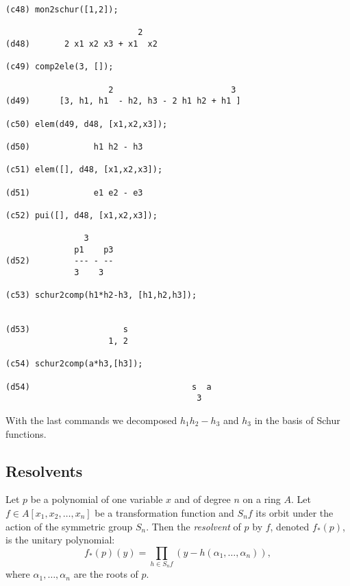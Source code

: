 \documentclass[11pt]{article}
\begin{document}
\begin{verbatim}
(c48) mon2schur([1,2]);

                           2
(d48)       2 x1 x2 x3 + x1  x2

(c49) comp2ele(3, []);

                     2                        3
(d49)      [3, h1, h1  - h2, h3 - 2 h1 h2 + h1 ]

(c50) elem(d49, d48, [x1,x2,x3]);

(d50)             h1 h2 - h3

(c51) elem([], d48, [x1,x2,x3]);

(d51)             e1 e2 - e3

(c52) pui([], d48, [x1,x2,x3]);

                3
              p1    p3
(d52)         --- - --
              3    3

(c53) schur2comp(h1*h2-h3, [h1,h2,h3]);


(d53) 				    s	  
				     1, 2

(c54) schur2comp(a*h3,[h3]);

(d54)                                 s  a
                                       3

\end{verbatim}
\normalsize
With the last commands we decomposed $h_1 h_2 - h_3$ and $h_3$ in the basis of
Schur functions.



\subsection{Resolvents}

Let $p$ be a polynomial of one variable $x$ and of degree $n$ on a ring $A$.
Let $f \in A[x_1,x_2,\ldots,x_n]$ be a transformation function and $S_nf$ its
orbit under the action of the symmetric group $S_n$.  Then the \emph{resolvent}
of $p$ by $f$, denoted $f_*(p)$, is the unitary polynomial:
\begin{equation*}
  f_*(p)(y) = \prod_{h\in S_nf} (y - h(\alpha_1,\ldots ,\alpha_n)),
\end{equation*}
where $\alpha_1,\ldots,\alpha_n$ are the roots of $p$.
\end{document}
